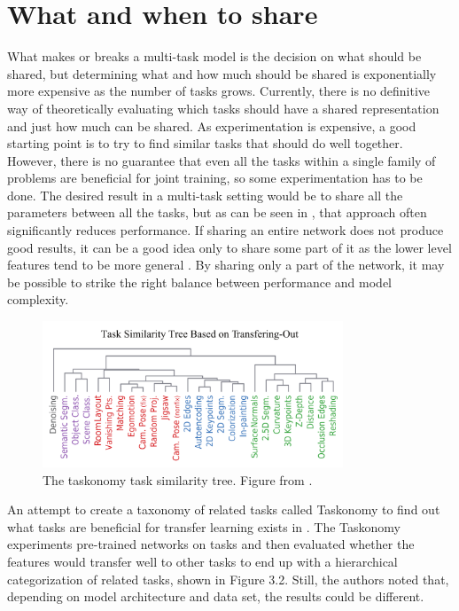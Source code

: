 \section{What and when to share}
What makes or breaks a multi-task model is the decision on what should be shared, but determining what and how much should be shared is exponentially more expensive as the number of tasks grows.
Currently, there is no definitive way of theoretically evaluating which tasks should have a shared representation and just how much can be shared.
As experimentation is expensive, a good starting point is to try to find similar tasks that should do well together.
However, there is no guarantee that even all the tasks within a single family of problems are beneficial for joint training, so some experimentation has to be done.
The desired result in a multi-task setting would be to share all the parameters between all the tasks, but as can be seen in \citep{uberNet}, that approach often significantly reduces performance.
If sharing an entire network does not produce good results, it can be a good idea only to share some part of it as the lower level features tend to be more general \citep{transferringMidLevelRepresentations}.
By sharing only a part of the network, it may be possible to strike the right balance between performance and model complexity.

\begin{figure}[h!]
    \centering
    \includegraphics[width=0.8\textwidth]{imgs/taskonomy.png}
    \caption{The taskonomy task similarity tree. Figure from \citep{taskonomy}.\label{fig:params}}
\end{figure}

An attempt to create a taxonomy of related tasks called Taskonomy to find out what tasks are beneficial for transfer learning exists in \citep{taskonomy}.
The Taskonomy experiments pre-trained networks on tasks and then evaluated whether the features would transfer well to other tasks to end up with a hierarchical categorization of related tasks, shown in Figure 3.2.
Still, the authors noted that, depending on model architecture and data set, the results could be different.

